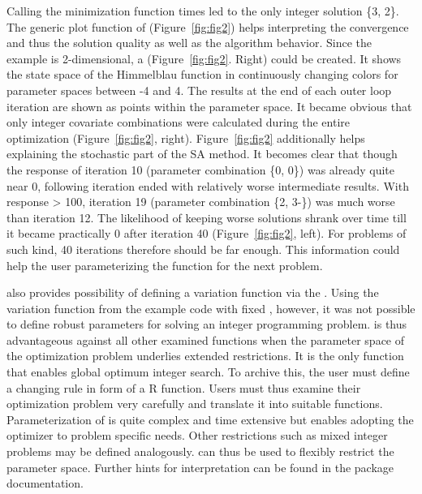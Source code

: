 Calling the minimization function times led to the only integer solution \{3, 2\}. The generic plot function of  (Figure~\ref{fig:fig2}) helps interpreting the convergence and thus the solution quality as well as the algorithm behavior. Since the example is 2-dimensional, a  (Figure~\ref{fig:fig2}. Right) could be created. It shows the state space of the Himmelblau function in continuously changing colors for parameter spaces between -4 and 4.  The results at the end of each outer loop iteration are shown as points within the parameter space. It became obvious that only integer covariate combinations were calculated during the entire optimization (Figure~\ref{fig:fig2}, right). Figure~\ref{fig:fig2} additionally helps explaining the stochastic part of the SA method. It becomes clear that though the response of iteration 10 (parameter combination \{0, 0\}) was already quite near 0, following iteration ended with relatively worse intermediate results. With response > 100, iteration 19 (parameter combination \{2, 3-\}) was much worse than iteration 12. The likelihood of keeping worse solutions shrank over time till it became practically 0 after iteration 40 (Figure~\ref{fig:fig2}, left). For problems of such kind, 40 iterations therefore should be far enough. This information could help the user parameterizing the function for the next problem.

 also provides possibility of defining a variation function via the . Using the variation function from the example code with fixed , however, it was not possible to define robust parameters for solving an integer programming problem.  is thus advantageous against all other examined functions when the parameter space of the optimization problem underlies extended restrictions. It is the only function that enables global optimum integer search. To archive this, the user must define a changing rule in form of a R function. Users must thus examine their optimization problem very carefully and translate it into suitable functions. Parameterization of  is quite complex and time extensive but enables adopting the optimizer to problem specific needs. Other restrictions such as mixed integer problems may be defined analogously.  can thus be used to flexibly restrict the parameter space. Further hints for interpretation can be found in the package documentation.

